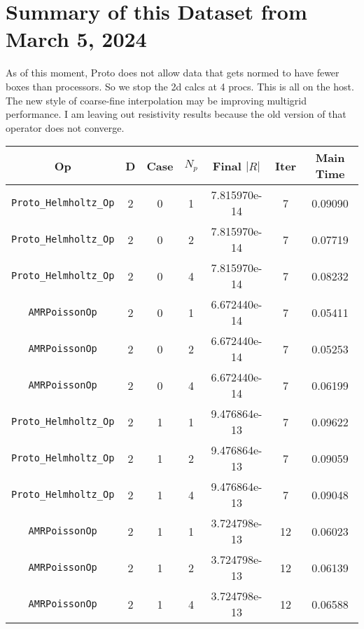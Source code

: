 \documentclass{article}
\begin{document}
\section{Summary of this Dataset from March 5, 2024}

As of this moment, Proto does not allow data that gets normed to have
fewer boxes than processors.  So we stop the 2d calcs at 4 procs.
This is all on the host.  The new style of coarse-fine interpolation
may be improving multigrid performance.  I am leaving out resistivity
results because the old version of that operator does not converge.

\begin{small}
\begin{table}
\begin{center}
\begin{tabular}{|c|c|c|c|c|c||c|} \hline
 Op & D & Case & $N_p$ & Final $|R|$  &  Iter & Main Time \\
\hline
 {\tt Proto\_Helmholtz\_Op} & 2 & 0 & 1   & 7.815970e-14   & 7       & 0.09090    \\
 {\tt Proto\_Helmholtz\_Op} & 2 & 0 & 2   & 7.815970e-14   & 7       & 0.07719    \\
 {\tt Proto\_Helmholtz\_Op} & 2 & 0 & 4   & 7.815970e-14   & 7       & 0.08232    \\
\hline                                    
 {\tt AMRPoissonOp}         & 2 & 0 & 1   & 6.672440e-14   & 7       & 0.05411    \\
 {\tt AMRPoissonOp}         & 2 & 0 & 2   & 6.672440e-14   & 7       & 0.05253    \\
 {\tt AMRPoissonOp}         & 2 & 0 & 4   & 6.672440e-14   & 7       & 0.06199    \\
\hline                                                                     
 {\tt Proto\_Helmholtz\_Op} & 2 & 1 & 1   & 9.476864e-13   & 7       &  0.09622   \\
 {\tt Proto\_Helmholtz\_Op} & 2 & 1 & 2   & 9.476864e-13   & 7       &  0.09059   \\
 {\tt Proto\_Helmholtz\_Op} & 2 & 1 & 4   & 9.476864e-13   & 7       &  0.09048   \\
\hline                                                                            
 {\tt AMRPoissonOp}         & 2 & 1 & 1   & 3.724798e-13   & 12      &  0.06023   \\
 {\tt AMRPoissonOp}         & 2 & 1 & 2   & 3.724798e-13   & 12      &  0.06139   \\
 {\tt AMRPoissonOp}         & 2 & 1 & 4   & 3.724798e-13   & 12      &  0.06588   \\

\end{tabular}
\end{center}
\end{table}
\end{small}
\end{document}
